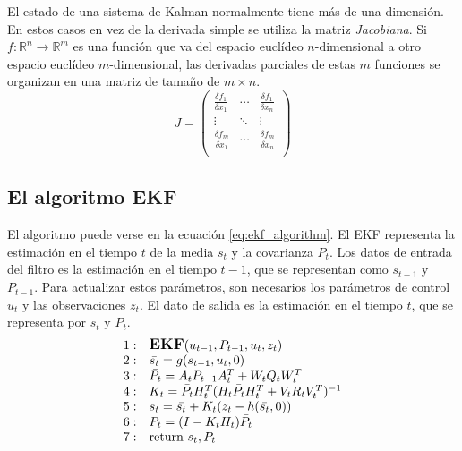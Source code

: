 El estado de una sistema de Kalman normalmente tiene más de una dimensión. En estos casos en vez de la derivada simple se utiliza la matriz \textit{Jacobiana}. Si $f:\mathbb{R}^n \rightarrow \mathbb{R}^m$ es una función que va del espacio euclídeo $n$-dimensional a otro espacio euclídeo $m$-dimensional, las derivadas parciales de estas $m$ funciones se organizan en una matriz de tamaño de $m \times n$. \\
\begin{equation}
  J = 
  \begin{pmatrix}
    \frac{\delta f_1}{\delta x_1} & \cdots & \frac{\delta f_1}{\delta x_n} \\
    \vdots                        & \ddots &                        \vdots \\
    \frac{\delta f_m}{\delta x_1} & \cdots & \frac{\delta f_m}{\delta x_n} \\    
  \end{pmatrix}
\end{equation}

\subsection{El algoritmo EKF}

El algoritmo puede verse en la ecuación \ref{eq:ekf_algorithm}. El EKF representa la estimación en el tiempo $t$ de la media $s_t$ y la covarianza $P_t$. Los datos de entrada del filtro es la estimación en el tiempo $t-1$, que se representan como $s_{t-1}$ y $P_{t-1}$. Para actualizar estos parámetros, son necesarios los parámetros de control $u_t$ y las observaciones $z_t$. El dato de salida es la estimación en el tiempo $t$, que se representa por $s_t$ y $P_t$.
\begin{equation}
\label{eq:ekf_algorithm}
\begin{array}{ll}
1: & \large{\textbf{EKF}}(u_{t-1}, P_{t-1}, u_t, z_t) \\
2: & \bar{s_t} = g(s_{t-1}, u_t, 0) \\
3: & \bar{P_t} = A_t P_{t-1} A^T_t + W_t Q_t W^T_t \\
4: & K_t = \bar{P_t} H^T_t ( H_t \bar{P_t} H^T_t + V_t R_t V^T_t )^{-1} \\
5: & s_t = \bar{s_t} + K_t ( z_t - h( \bar{s_t}, 0 ) ) \\
6: & P_t = ( I - K_t H_t ) \bar{P_t} \\
7: & \mbox{return } s_t, P_t
\end{array}
\end{equation}

